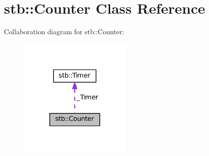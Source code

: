 \hypertarget{classstb_1_1Counter}{\section{stb\+:\+:Counter Class Reference}
\label{classstb_1_1Counter}
}


Collaboration diagram for stb\+:\+:Counter\+:
\nopagebreak
\begin{figure}[H]
\begin{center}
\leavevmode
\includegraphics[width=156pt]{classstb_1_1Counter__coll__graph}
\end{center}
\end{figure}
